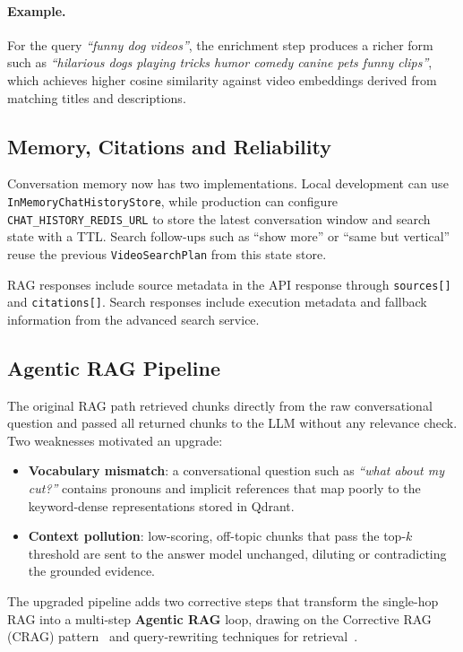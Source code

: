 \paragraph{Example.}
For the query \emph{``funny dog videos''}, the enrichment step produces a richer form such as
\emph{``hilarious dogs playing tricks humor comedy canine pets funny clips''}, which achieves
higher cosine similarity against video embeddings derived from matching titles and descriptions.

\subsection{Memory, Citations and Reliability}

Conversation memory now has two implementations. Local development can use
\texttt{InMemoryChatHistoryStore}, while production can configure \texttt{CHAT\_HISTORY\_REDIS\_URL}
to store the latest conversation window and search state with a TTL. Search follow-ups such as
``show more'' or ``same but vertical'' reuse the previous \texttt{VideoSearchPlan} from this
state store.

RAG responses include source metadata in the API response through \texttt{sources[]} and
\texttt{citations[]}. Search responses include execution metadata and fallback information from
the advanced search service.

\subsection{Agentic RAG Pipeline}

The original RAG path retrieved chunks directly from the raw conversational question and passed
all returned chunks to the LLM without any relevance check. Two weaknesses motivated an upgrade:

\begin{itemize}
  \item \textbf{Vocabulary mismatch}: a conversational question such as \emph{``what about my
    cut?''} contains pronouns and implicit references that map poorly to the keyword-dense
    representations stored in Qdrant.
  \item \textbf{Context pollution}: low-scoring, off-topic chunks that pass the top-$k$
    threshold are sent to the answer model unchanged, diluting or contradicting the grounded
    evidence.
\end{itemize}

The upgraded pipeline adds two corrective steps that transform the single-hop RAG into a
multi-step \textbf{Agentic RAG} loop, drawing on the Corrective RAG (CRAG)
pattern~\cite{crag_2024} and query-rewriting techniques for
retrieval~\cite{query_rewriting_rag}.

